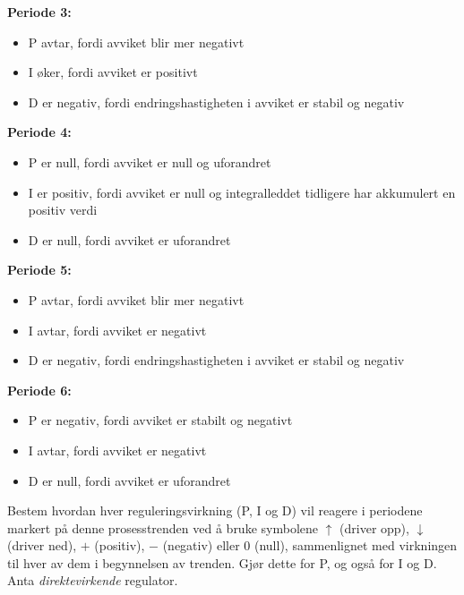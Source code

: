 {\bf Periode 3:}

\begin{itemize}
\item{}P avtar, fordi avviket blir mer negativt
\item{}I øker, fordi avviket er positivt
\item{}D er negativ, fordi endringshastigheten i avviket er stabil og negativ
\end{itemize}
\bigskip



{\bf Periode 4:}

\begin{itemize}
\item{}P er null, fordi avviket er null og uforandret
\item{}I er positiv, fordi avviket er null og integralleddet tidligere har akkumulert en positiv verdi
\item{}D er null, fordi avviket er uforandret
\end{itemize}
\bigskip



{\bf Periode 5:}

\begin{itemize}
\item{}P avtar, fordi avviket blir mer negativt
\item{}I avtar, fordi avviket er negativt
\item{}D er negativ, fordi endringshastigheten i avviket er stabil og negativ
\end{itemize}
\bigskip



{\bf Periode 6:}

\begin{itemize}
\item{}P er negativ, fordi avviket er stabilt og negativt
\item{}I avtar, fordi avviket er negativt
\item{}D er null, fordi avviket er uforandret
\end{itemize}





Bestem hvordan hver reguleringsvirkning (P, I og D) vil reagere i periodene markert på denne prosesstrenden ved å bruke symbolene $\uparrow$ (driver opp), $\downarrow$ (driver ned), $+$ (positiv), $-$ (negativ) eller 0 (null), sammenlignet med virkningen til hver av dem i begynnelsen av trenden. Gjør dette for P, og også for I og D. Anta {\it direktevirkende} regulator.

